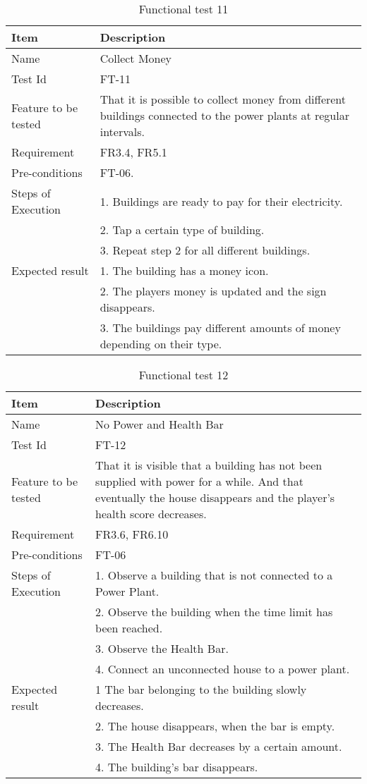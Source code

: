 \begin{table}[H]
\centering
	\begin{tabular}{ l | p{8cm} }
		\hline
		{\bf Item} & {\bf Description} \\ \hline
		Name & Collect Money \\ 
		Test Id & FT-11 \\ 
		Feature to be tested & That it is possible to collect money from different buildings connected to the power plants at regular intervals. \\
		Requirement & FR3.4, FR5.1 \\ 
		Pre-conditions & FT-06. \\ 
		Steps of Execution & 1. Buildings are ready to pay for their electricity. \\
		& 2. Tap a certain type of building. \\ 
		& 3. Repeat step 2 for all different buildings. \\
		Expected result & 1. The building has a money icon. \\
		& 2. The players money is updated and the sign disappears. \\
		& 3. The buildings pay different amounts of money depending on their type. \\
	\end{tabular}
	\caption{Functional test 11}
\end{table}

\begin{table}[H]
\centering
	\begin{tabular}{ l | p{8cm} }
		\hline
		{\bf Item} & {\bf Description} \\ \hline
		Name & No Power and Health Bar \\ 
		Test Id & FT-12 \\ 
		Feature to be tested & That it is visible that a building has not been supplied with power for a while. And that eventually the house disappears and the player's health score decreases. \\
		Requirement & FR3.6, FR6.10 \\ 
		Pre-conditions & FT-06 \\ 
		Steps of Execution &  1. Observe a building that is not connected to a Power Plant. \\ 
		& 2. Observe the building when the time limit has been reached. \\
		& 3. Observe the Health Bar. \\
		& 4. Connect an unconnected house to a power plant. \\
		Expected result & 1 The bar belonging to the building slowly decreases. \\
		& 2. The house disappears, when the bar is empty. \\
		& 3. The Health Bar decreases by a certain amount. \\
		& 4. The building's bar disappears. \\
	\end{tabular}
	\caption{Functional test 12}
\end{table}

